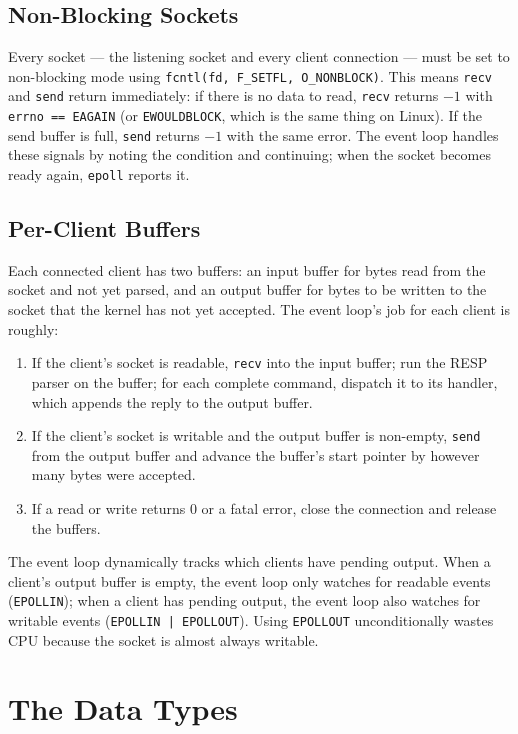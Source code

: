 \documentclass[11pt,a4paper]{article}
\begin{document}
\subsection{Non-Blocking Sockets}
Every socket --- the listening socket and every client connection --- must be set to non-blocking mode using \texttt{fcntl(fd, F\_SETFL, O\_NONBLOCK)}. This means \texttt{recv} and \texttt{send} return immediately: if there is no data to read, \texttt{recv} returns $-1$ with \texttt{errno == EAGAIN} (or \texttt{EWOULDBLOCK}, which is the same thing on Linux). If the send buffer is full, \texttt{send} returns $-1$ with the same error. The event loop handles these signals by noting the condition and continuing; when the socket becomes ready again, \texttt{epoll} reports it.

\subsection{Per-Client Buffers}
Each connected client has two buffers: an input buffer for bytes read from the socket and not yet parsed, and an output buffer for bytes to be written to the socket that the kernel has not yet accepted. The event loop's job for each client is roughly:

\begin{enumerate}
\item If the client's socket is readable, \texttt{recv} into the input buffer; run the RESP parser on the buffer; for each complete command, dispatch it to its handler, which appends the reply to the output buffer.
\item If the client's socket is writable and the output buffer is non-empty, \texttt{send} from the output buffer and advance the buffer's start pointer by however many bytes were accepted.
\item If a read or write returns 0 or a fatal error, close the connection and release the buffers.
\end{enumerate}

The event loop dynamically tracks which clients have pending output. When a client's output buffer is empty, the event loop only watches for readable events (\texttt{EPOLLIN}); when a client has pending output, the event loop also watches for writable events (\texttt{EPOLLIN | EPOLLOUT}). Using \texttt{EPOLLOUT} unconditionally wastes CPU because the socket is almost always writable.

\section{The Data Types}
\end{document}
